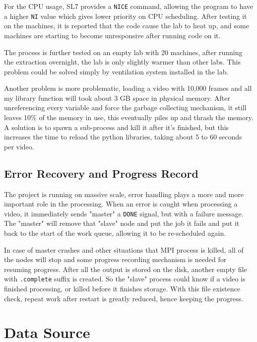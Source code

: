 \documentclass[bsc,logo,twoside,fullspacing,parskip]{infthesis}
\begin{document}
For the CPU usage, SL7 provides a {\tt NICE} command, allowing the program to have a higher {\tt NI} value which gives lower priority on CPU scheduling. After testing it on the machines, it is reported that the code cause the lab to heat up, and some machines are starting to become unresponsive after running code on it.

The process is further tested on an empty lab with 20 machines, after running the extraction overnight, the lab is only slightly warmer than other labs. This problem could be solved simply by ventilation system installed in the lab.

Another problem is more problematic, loading a video with 10,000 frames and all my library function will took about 3 GB space in physical memory. After unreferencing every variable and force the garbage collecting mechanism, it still leaves 10\% of the memory in use, this eventually piles up and thrash the memory. A solution is to spawn a sub-process and kill it after it's finished, but this increases the time to reload the python libraries, taking about 5 to 60 seconds per video.

\section{Error Recovery and Progress Record}

The project is running on massive scale, error handling plays a more and more important role in the processing. When an error is caught when processing a video, it immediately sends "master" a {\tt DONE} signal, but with a failure message. The "master" will remove that "slave" node and put the job it fails and put it back to the start of the work queue, allowing it to be re-scheduled again.

In case of master crashes and other situations that MPI process is killed, all of the nodes will stop and some progress recording mechanism is needed for resuming progress. After all the output is stored on the disk, another empty file with {\tt .complete} suffix is created. So the "slave" process could know if a video is finished processing, or killed before it finishes storage. With this file existence check, repeat work after restart is greatly reduced, hence keeping the progress.

\newpage

\chapter{Data Source}
\label{sec:datasource}
\end{document}
